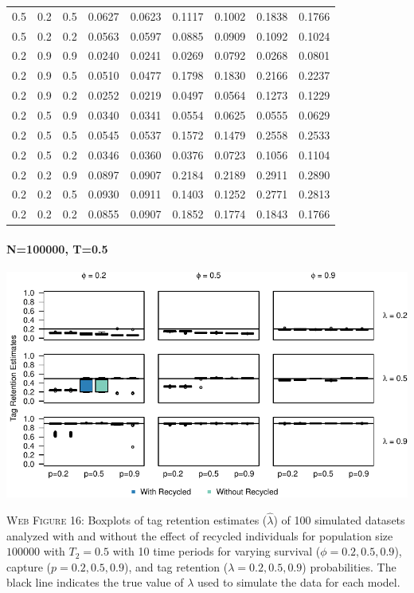 \documentclass[]{article}
\let\oldparagraph\paragraph
\renewcommand{\paragraph}[1]{\oldparagraph{#1}\mbox{}}
\begin{document}
\begin{table}[ht]
{\begin{tabular}{rrrrrrrrr}
  0.5 & 0.2 & 0.5 & 0.0627 & 0.0623 & 0.1117 & 0.1002 & 0.1838 & 0.1766 \\ 
  0.5 & 0.2 & 0.2 & 0.0563 & 0.0597 & 0.0885 & 0.0909 & 0.1092 & 0.1024 \\ 
  0.2 & 0.9 & 0.9 & 0.0240 & 0.0241 & 0.0269 & 0.0792 & 0.0268 & 0.0801 \\ 
  0.2 & 0.9 & 0.5 & 0.0510 & 0.0477 & 0.1798 & 0.1830 & 0.2166 & 0.2237 \\ 
  0.2 & 0.9 & 0.2 & 0.0252 & 0.0219 & 0.0497 & 0.0564 & 0.1273 & 0.1229 \\ 
  0.2 & 0.5 & 0.9 & 0.0340 & 0.0341 & 0.0554 & 0.0625 & 0.0555 & 0.0629 \\ 
  0.2 & 0.5 & 0.5 & 0.0545 & 0.0537 & 0.1572 & 0.1479 & 0.2558 & 0.2533 \\ 
  0.2 & 0.5 & 0.2 & 0.0346 & 0.0360 & 0.0376 & 0.0723 & 0.1056 & 0.1104 \\ 
  0.2 & 0.2 & 0.9 & 0.0897 & 0.0907 & 0.2184 & 0.2189 & 0.2911 & 0.2890 \\ 
  0.2 & 0.2 & 0.5 & 0.0930 & 0.0911 & 0.1403 & 0.1252 & 0.2771 & 0.2813 \\ 
  0.2 & 0.2 & 0.2 & 0.0855 & 0.0907 & 0.1852 & 0.1774 & 0.1843 & 0.1766 \\ 
   \hline
\end{tabular}
}
\endgroup
\end{table}

\newpage

\paragraph{N=100000, T=0.5}\label{n100000-t0.5-2}

\includegraphics{Appendix_files/figure-latex/figure16_tagretention_GJSTL3-1.pdf}

\textsc{Web Figure 16:} Boxplots of tag retention estimates
(\(\hat{\lambda}\)) of 100 simulated datasets analyzed with and without
the effect of recycled individuals for population size \(100000\) with
\(T_2=0.5\) with 10 time periods for varying survival
(\(\phi=0.2,0.5,0.9\)), capture (\(p=0.2,0.5,0.9\)), and tag retention
(\(\lambda=0.2,0.5,0.9\)) probabilities. The black line indicates the
true value of \(\lambda\) used to simulate the data for each model.
\end{document}
